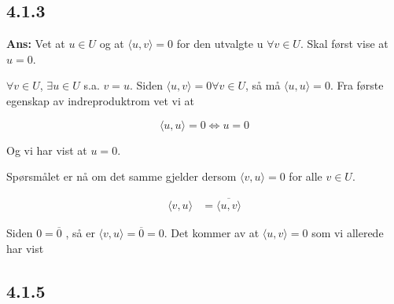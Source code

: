 \documentclass[11pt]{article}
\newenvironment{solbox}
  {\begin{mdframed}[linewidth=1pt,linecolor=black,roundcorner=5pt]
   \noindent\textbf{Ans: }\enspace}
  {\end{mdframed}}
\newcommand{\compconj}[1]{%
  \overline{#1}%
}
\begin{document}
\subsection{4.1.3}

\begin{solbox}
    Vet at $ u \in U $ og at $ \langle u, v \rangle =0 $ for den utvalgte u $ \forall v \in U $. Skal først vise at $ u=0 $.
    
    
    $ \forall v \in U$, $ \exists u \in U $ s.a. $ v=u $. Siden $ \langle u, v \rangle =0 \forall v \in U $, så må $ \langle u,u \rangle = 0$. Fra første egenskap av indreproduktrom vet vi at
    
    \[
        \langle u, u \rangle =0 \Longleftrightarrow u=0
    \]

    Og vi har vist at $ u=0 $.
    
    
    Spørsmålet er nå om det samme gjelder dersom $ \langle v, u \rangle =0 $ for alle $ v \in U $.
    
    
    \begin{align*}
        \langle v, u \rangle &= \compconj{ \langle u, v \rangle }
    \end{align*}

    Siden $ 0 = \compconj{0} $ , så er $ \langle v, u \rangle = \compconj{0}  =0$. Det kommer av at $ \langle u, v \rangle =0 $ som vi allerede har vist
    
    
\end{solbox}


\subsection{4.1.5}
\end{document}
